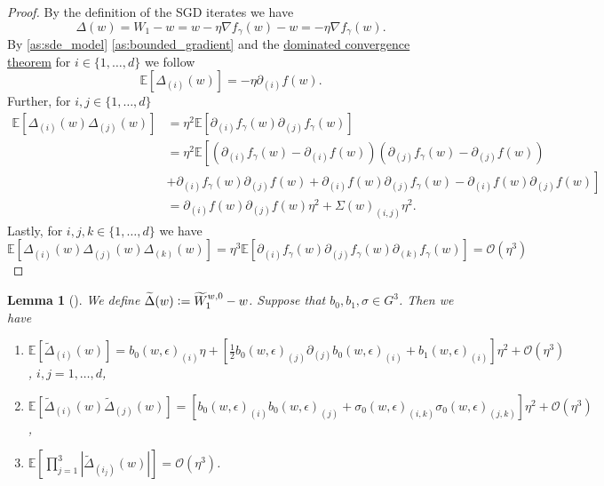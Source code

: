 \documentclass[12pt]{article}
\newtheorem{lemma}[lemma]{Lemma}
\theoremstyle{definition}
\numberwithin{equation}{section}
\newcommand{\ev}[1]{\mathbb{E}\left[{#1}\right]}
\newcommand{\defeq}{\vcentcolon=}
\begin{document}
\begin{proof}
  By the definition of the SGD iterates we have
  \begin{equation*}
    \Delta(w) = W_{1} - w = w - \eta \nabla f_{\gamma}(w) - w = - \eta \nabla f_{\gamma}(w).
  \end{equation*}
  By \autoref{as:sde_model} \ref{as:bounded_gradient} and the \hyperref[thm:dominated_convergence]{dominated convergence theorem} for $i \in \{1,\dots,d\}$ we follow
  \begin{equation*}
    \ev{\Delta_{(i)}(w)} = - \eta \partial_{(i)} f(w).
  \end{equation*}
  Further, for  $i,j \in \{1,\dots,d\}$
  \begin{align*}
    \ev{\Delta_{(i)}(w)\Delta_{(j)}(w)} &= \eta^2 \ev{\partial_{(i)}f_{\gamma}(w)\partial_{(j)}f_{\gamma}(w)} \\
    &= \eta^2 \mathbb{E}\left[(\partial_{(i)}f_{\gamma}(w)- \partial_{(i)}f(w))(\partial_{(j)}f_{\gamma}(w) - \partial_{(j)}f(w)) \right. \\
    &+ \left. \partial_{(i)}f_{\gamma}(w)\partial_{(j)}f(w) + \partial_{(i)}f(w)\partial_{(j)}f_{\gamma}(w) - \partial_{(i)}f(w)\partial_{(j)}f(w) \right] \\
    &= \partial_{(i)} f(w)\partial_{(j)} f(w) \eta^2 + \Sigma(w)_{(i,j)}\eta^2.
  \end{align*}
  Lastly, for $i,j,k \in \{1,\dots,d\}$ we have
  \begin{equation*}
    \ev{\Delta_{(i)}(w)\Delta_{(j)}(w)\Delta_{(k)}(w)} = \eta^3 \ev{\partial_{(i)}f_{\gamma}(w)\partial_{(j)}f_{\gamma}(w)\partial_{(k)}f_{\gamma}(w)} = \mathcal{O}(\eta^3)
  \end{equation*}
\end{proof}
\begin{lemma}[]
  \label{lem:sde_one_step}
  We define $ \widetilde{\Delta}(w) \defeq \widetilde{W}^{w,0}_1 - w$. Suppose that $b_0, b_1, \sigma \in G^3$. Then we have
  \begin{enumerate}[label=(\roman*)]
    \item  $\ev{\widetilde{\Delta}_{(i)}(w)} = b_0(w,\epsilon)_{(i)}\eta + \left[\frac{1}{2}b_0(w,\epsilon)_{(j)}\partial_{(j)}b_0(w,\epsilon)_{(i)} + b_1(w,\epsilon)_{(i)}\right] \eta^2 + \mathcal{O}(\eta^3)$, $i,j= 1,\dots,d$,
    \item $\ev{\widetilde{\Delta}_{(i)}(w)\widetilde{\Delta}_{(j)}(w)} = \left[b_0(w, \epsilon)_{(i)}b_0(w,\epsilon)_{(j)} + \sigma_0(w, \epsilon)_{(i,k)}\sigma_0(w,\epsilon)_{(j,k)}\right]\eta^2 + \mathcal{O}(\eta^3)$,
    \item $\ev{\prod_{j=1}^3\left\lvert\widetilde{\Delta}_{(i_j)}(w)\right\rvert} = \mathcal{O}(\eta^3)$.
  \end{enumerate}
\end{lemma}
\end{document}
